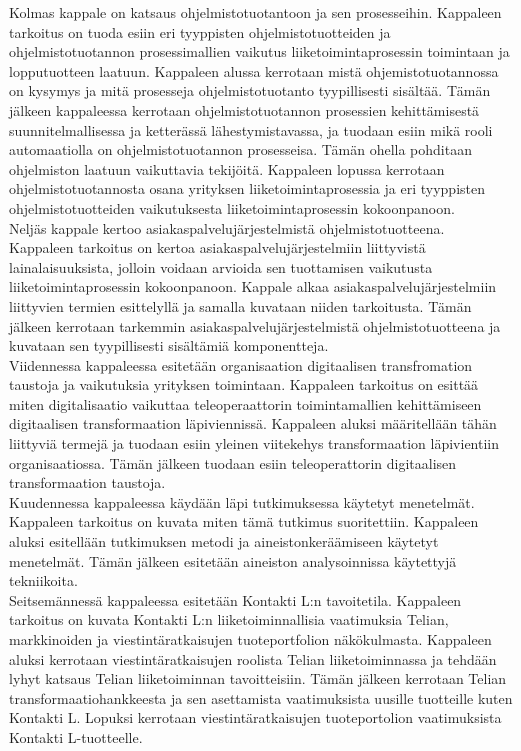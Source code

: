 \documentclass[finnish,12pt,a4paper,pdftex]{article}
\begin{document}
\noindent Kolmas kappale on katsaus ohjelmistotuotantoon ja sen prosesseihin. Kappaleen tarkoitus on tuoda esiin eri tyyppisten ohjelmistotuotteiden ja ohjelmistotuotannon prosessimallien vaikutus liiketoimintaprosessin toimintaan ja lopputuotteen laatuun. Kappaleen alussa kerrotaan mistä ohjemistotuotannossa on kysymys ja mitä prosesseja ohjelmistotuotanto tyypillisesti sisältää. Tämän jälkeen kappaleessa kerrotaan ohjelmistotuotannon prosessien kehittämisestä suunnitelmallisessa ja ketterässä lähestymistavassa, ja tuodaan esiin mikä rooli automaatiolla on ohjelmistotuotannon prosesseisa. Tämän ohella pohditaan ohjelmiston laatuun vaikuttavia tekijöitä. Kappaleen lopussa kerrotaan ohjelmistotuotannosta osana yrityksen liiketoimintaprosessia ja eri tyyppisten ohjelmistotuotteiden vaikutuksesta liiketoimintaprosessin kokoonpanoon. \\

\noindent Neljäs kappale kertoo asiakaspalvelujärjestelmistä ohjelmistotuotteena. Kappaleen tarkoitus on kertoa asiakaspalvelujärjestelmiin liittyvistä lainalaisuuksista, jolloin voidaan arvioida sen tuottamisen vaikutusta liiketoimintaprosessin kokoonpanoon. Kappale alkaa asiakaspalvelujärjestelmiin liittyvien termien esittelyllä ja samalla kuvataan niiden tarkoitusta. Tämän jälkeen kerrotaan tarkemmin asiakaspalvelujärjestelmistä ohjelmistotuotteena ja kuvataan sen tyypillisesti sisältämiä komponentteja. \\

\noindent Viidennessa kappaleessa esitetään organisaation digitaalisen transfromation taustoja ja vaikutuksia yrityksen toimintaan. Kappaleen tarkoitus on esittää miten digitalisaatio vaikuttaa teleoperaattorin toimintamallien kehittämiseen digitaalisen transformaation läpiviennissä. Kappaleen aluksi määritellään tähän liittyviä termejä ja tuodaan esiin yleinen viitekehys transformaation läpivientiin organisaatiossa. Tämän jälkeen tuodaan esiin teleoperattorin digitaalisen transformaation taustoja. \\

\noindent Kuudennessa kappaleessa käydään läpi tutkimuksessa käytetyt menetelmät. Kappaleen tarkoitus on kuvata miten tämä tutkimus suoritettiin. Kappaleen aluksi esitellään tutkimuksen metodi ja aineistonkeräämiseen käytetyt menetelmät. Tämän jälkeen esitetään aineiston analysoinnissa käytettyjä tekniikoita.\\

\noindent Seitsemännessä kappaleessa esitetään Kontakti L:n tavoitetila. Kappaleen tarkoitus on kuvata Kontakti L:n liiketoiminnallisia vaatimuksia Telian, markkinoiden ja viestintäratkaisujen tuoteportfolion näkökulmasta. Kappaleen aluksi kerrotaan viestintäratkaisujen roolista Telian liiketoiminnassa ja tehdään lyhyt katsaus Telian liiketoiminnan tavoitteisiin. Tämän jälkeen kerrotaan Telian transformaatiohankkeesta ja sen asettamista vaatimuksista uusille tuotteille kuten Kontakti L. Lopuksi kerrotaan viestintäratkaisujen tuoteportolion vaatimuksista Kontakti L-tuotteelle.\\
\end{document}
